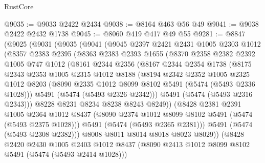 \begin{lexlean}{RustCore}
\begin{coremodule}
@9035 := @9033 @2422 @2434
@9038 := @8164 @463 @56 @49
@9041 := @9038 @2422 @2432 @1738
@9045 := @8060 @419 @417 @49 @55
@9281 := @8847
    (@9025
      (@9031
        (@9035
          (@9041
            (@9045
              @2397
              @2421
              @2431
              @1005
              @2303
              @1012
              (@8357
                @2383
                @2395
                (@8363
                  @2383
                  @2393
                  @1655
                  (@8370
                    @2358
                    @2382
                    @2392
                    @1005
                    @747
                    @1012
                    (@8161
                      @2344
                      @2356
                      (@8167
                        @2344
                        @2354
                        @1738
                        (@8175
                          @2343
                          @2353
                          @1005
                          @2315
                          @1012
                          @8188
                          (@8194
                            @2342
                            @2352
                            @1005
                            @2325
                            @1012
                            @8203
                            (@8090 @2335 @1012 @8099 @8102 @5491 (@5474 (@5493 @2336 @1028)))
                            @5491
                            (@5474 (@5493 @2326 @2342)))
                          @5491
                          (@5474 (@5493 @2316 @2343)))
                        @8228
                        @8231
                        @8234
                        @8238
                        @8243
                        @8249))
                    (@8428
                      @2381
                      @2391
                      @1005
                      @2364
                      @1012
                      @8437
                      (@8090 @2374 @1012 @8099 @8102 @5491 (@5474 (@5493 @2375 @1028)))
                      @5491
                      (@5474 (@5493 @2365 @2381)))
                    @5491
                    (@5474 (@5493 @2308 @2382)))
                  @8008
                  @8011
                  @8014
                  @8018
                  @8023
                  @8029))
              (@8428
                @2420
                @2430
                @1005
                @2403
                @1012
                @8437
                (@8090 @2413 @1012 @8099 @8102 @5491 (@5474 (@5493 @2414 @1028)))

\end{coremodule}
\end{lexlean}
